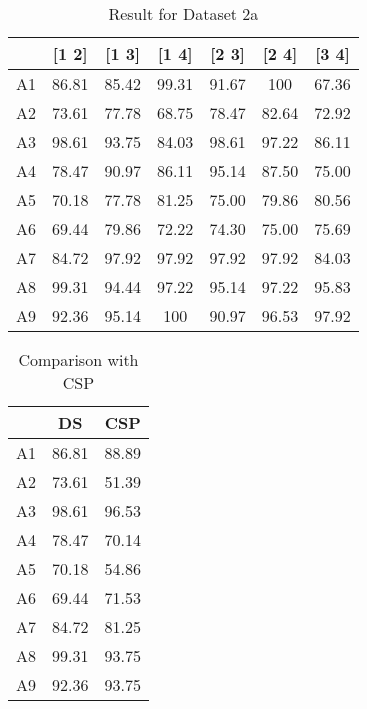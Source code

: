 \begin{table}[hbtp]
 \caption {Result for Dataset 2a}
 \centering
    \begin{tabular}{|c|c|c|c|c|c|c|}
    \hline
    ~  & [1 2] & [1 3] & [1 4] & [2 3] & [2 4] & [3 4] \\ \hline
    A1 & 86.81 & 85.42 & 99.31 & 91.67 & 100   & 67.36 \\ \hline
    A2 & 73.61 & 77.78 & 68.75 & 78.47 & 82.64 & 72.92 \\ \hline
    A3 & 98.61 & 93.75 & 84.03 & 98.61 & 97.22 & 86.11 \\ \hline
    A4 & 78.47 & 90.97 & 86.11 & 95.14 & 87.50 & 75.00 \\ \hline
    A5 & 70.18 & 77.78 & 81.25 & 75.00 & 79.86 & 80.56 \\ \hline
    A6 & 69.44 & 79.86 & 72.22 & 74.30 & 75.00 & 75.69 \\ \hline
    A7 & 84.72 & 97.92 & 97.92 & 97.92 & 97.92 & 84.03 \\ \hline
    A8 & 99.31 & 94.44 & 97.22 & 95.14 & 97.22 & 95.83 \\ \hline
    A9 & 92.36 & 95.14 & 100   & 90.97 & 96.53 & 97.92 \\ \hline
    \end{tabular}
    
   
    \label{akb1}
\end{table}

\begin{table}
 \caption {Comparison with CSP}
 \centering
    \begin{tabular}{|c|c|c|}
    \hline
    ~  & DS    & CSP   \\ \hline
    A1 & 86.81 & 88.89 \\ \hline
    A2 & 73.61 & 51.39 \\ \hline
    A3 & 98.61 & 96.53 \\ \hline
    A4 & 78.47 & 70.14 \\ \hline
    A5 & 70.18 & 54.86 \\ \hline
    A6 & 69.44 & 71.53 \\ \hline
    A7 & 84.72 & 81.25 \\ \hline
    A8 & 99.31 & 93.75 \\ \hline
    A9 & 92.36 & 93.75 \\ \hline
    \end{tabular}
   
    \label{akb3}
\end{table}
    
